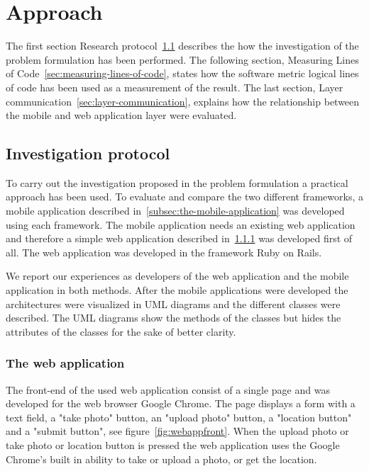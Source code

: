 \chapter{Approach} \label{ch:approach}
The first section Research protocol~\ref{sec:investigation-protocol} describes the how the investigation of the problem formulation has been performed. The following section, Measuring Lines of Code~\ref{sec:measuring-lines-of-code}, states how the software metric logical lines of code has been used as a measurement of the result. The last section, Layer communication~\ref{sec:layer-communication}, explains how the relationship between the mobile and web application layer were evaluated. 


\section{Investigation protocol} \label{sec:investigation-protocol}
To carry out the investigation proposed in the problem formulation a practical approach has been used. To evaluate and compare the two different frameworks, a mobile application described in~\ref{subsec:the-mobile-application} was developed using each framework. The mobile application needs an existing web application and therefore a simple web application described in~\ref{subsec:the-web-application} was developed first of all. The web application was developed in the framework Ruby on Rails.

We report our experiences as developers of the web application and the mobile application in both methods. After the mobile applications were developed the architectures were visualized in UML diagrams and the different classes were described. The UML diagrams show the methods of the classes but hides the attributes of the classes for the sake of better clarity. 

\subsection{The web application} \label{subsec:the-web-application}
The front-end of the used web application consist of a single page and was developed for the web browser Google Chrome. The page displays a form with a text field, a "take photo" button, an "upload photo" button, a "location button" and a "submit button", see figure~\ref{fig:webappfront}. When the upload photo or take photo or location button is pressed the web application uses the Google Chrome’s built in ability to take or upload a photo,	 or get the location.

